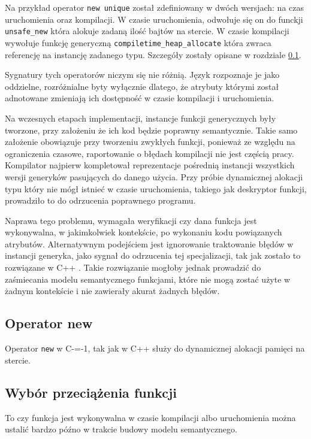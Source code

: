 Na przykład operator \lstinline{new unique} został zdefiniowany w dwóch wersjach: na czas uruchomienia oraz kompilacji.
W czasie uruchomienia, odwołuje się on do funckji \lstinline{unsafe_new} która alokuje zadaną ilość bajtów na stercie.
W czasie kompilacji wywołuje funkcję generyczną \lstinline{compiletime_heap_allocate} która zwraca referencję na instancję zadanego typu.
Szczegóły zostały opisane w rozdziale \ref{operator_new}.

Sygnatury tych operatorów niczym się nie różnią.
Język rozpoznaje je jako oddzielne, rozróżnialne byty wyłącznie dlatego, że atrybuty którymi został adnotowane zmieniają ich dostępność w czasie kompilacji i uruchomienia.

Na wczesnych etapach implementacji, instancje funkcji generycznych były tworzone, przy założeniu że ich kod będzie poprawny semantycznie.
Takie samo założenie obowiązuje przy tworzeniu zwykłych funkcji, ponieważ ze względu na ograniczenia czasowe, raportowanie o błędach kompilacji nie jest częścią pracy.
Kompilator najpierw kompletował reprezentacje pośrednią instancji wszystkich wersji generyków pasujących do danego użycia.
Przy próbie dynamicznej alokacji typu który nie mógł istnieć w czasie uruchomienia, takiego jak deskryptor funkcji, prowadziło to do odrzucenia poprawnego programu.

Naprawa tego problemu, wymagała weryfikacji czy dana funkcja jest wykonywalna, w jakimkolwiek kontekście, po wykonaniu kodu powiązanych atrybutów.
Alternatywnym podejściem jest ignorowanie traktowanie błędów w instancji generyka, jako sygnał do odrzucenia tej specjalizacji, tak jak zostało to rozwiązane w C++ \cite{cppTemplatesCompleteGuide}.
Takie rozwiązanie mogłoby jednak prowadzić do zaśmiecania modelu semantycznego funkcjami, które nie mogą zostać użyte w żadnym kontekście i nie zawierały akurat żadnych błędów.
\subsection{Operator new}
\label{operator_new}
Operator \lstinline{new} w C-=-1, tak jak w C++ służy do dynamicznej alokacji pamięci na stercie.

\subsection{Wybór przeciążenia funkcji}
\label{Function_overload_resolution}
To czy funkcja jest wykonywalna w czasie kompilacji albo uruchomienia można ustalić bardzo późno w trakcie budowy modelu semantycznego.

